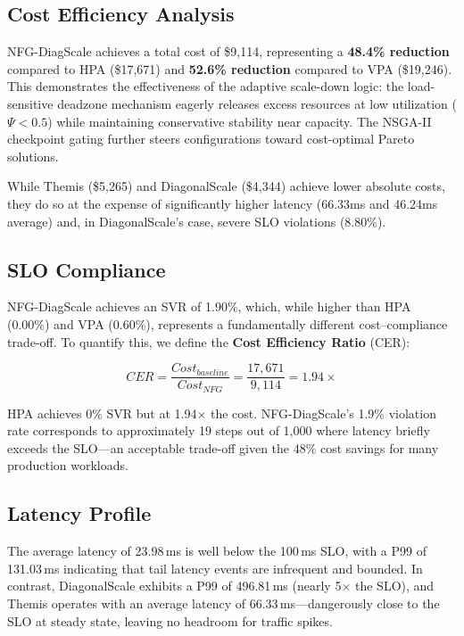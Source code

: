 \documentclass[conference]{IEEEtran}
\begin{document}
\subsection{Cost Efficiency Analysis}

NFG-DiagScale achieves a total cost of \$9,114, representing a \textbf{48.4\% reduction} compared to HPA (\$17,671) and \textbf{52.6\% reduction} compared to VPA (\$19,246). This demonstrates the effectiveness of the adaptive scale-down logic: the load-sensitive deadzone mechanism eagerly releases excess resources at low utilization ($\Psi < 0.5$) while maintaining conservative stability near capacity. The NSGA-II checkpoint gating further steers configurations toward cost-optimal Pareto solutions.

While Themis (\$5,265) and DiagonalScale (\$4,344) achieve lower absolute costs, they do so at the expense of significantly higher latency (66.33ms and 46.24ms average) and, in DiagonalScale's case, severe SLO violations (8.80\%).

\subsection{SLO Compliance}

NFG-DiagScale achieves an SVR of 1.90\%, which, while higher than HPA (0.00\%) and VPA (0.60\%), represents a fundamentally different cost--compliance trade-off. To quantify this, we define the \textbf{Cost Efficiency Ratio} (CER):

\begin{equation}
CER = \frac{Cost_{baseline}}{Cost_{NFG}} = \frac{17{,}671}{9{,}114} = 1.94\times
\end{equation}

\noindent HPA achieves 0\% SVR but at 1.94$\times$ the cost. NFG-DiagScale's 1.9\% violation rate corresponds to approximately 19 steps out of 1,000 where latency briefly exceeds the SLO---an acceptable trade-off given the 48\% cost savings for many production workloads.

\subsection{Latency Profile}

The average latency of 23.98\,ms is well below the 100\,ms SLO, with a P99 of 131.03\,ms indicating that tail latency events are infrequent and bounded. In contrast, DiagonalScale exhibits a P99 of 496.81\,ms (nearly 5$\times$ the SLO), and Themis operates with an average latency of 66.33\,ms---dangerously close to the SLO at steady state, leaving no headroom for traffic spikes.
\end{document}
